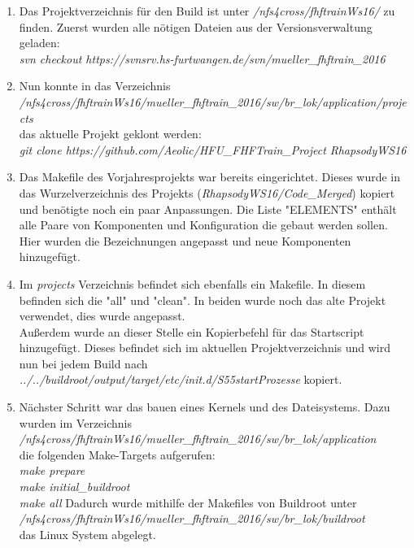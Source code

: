 \begin{enumerate}
	\item Das Projektverzeichnis für den Build ist unter \textit{/nfs4cross/fhftrainWs16/} zu finden. Zuerst wurden alle nötigen Dateien aus der Versionsverwaltung geladen:\\
	\textit{svn checkout https://svnsrv.hs-furtwangen.de/svn/mueller\_fhftrain\_2016}
	
	\item Nun konnte in das Verzeichnis\\ \textit{/nfs4cross/fhftrainWs16/mueller\_fhftrain\_2016/sw/br\_lok/application/projects}\\
	das aktuelle Projekt geklont werden:\\
	\textit{git clone https://github.com/Aeolic/HFU\_FHFTrain\_Project RhapsodyWS16}
	
	\item Das Makefile des Vorjahresprojekts war bereits eingerichtet. Dieses wurde in das Wurzelverzeichnis des Projekts (\textit{RhapsodyWS16/Code\_Merged}) kopiert und benötigte noch ein paar Anpassungen. Die Liste "ELEMENTS" enthält alle Paare von Komponenten und  Konfiguration die gebaut werden sollen. Hier wurden die Bezeichnungen angepasst und neue Komponenten hinzugefügt.
	
	\item Im \textit{projects} Verzeichnis befindet sich ebenfalls ein Makefile. In diesem befinden sich die "all" und "clean". In beiden wurde noch das alte Projekt verwendet, dies wurde angepasst.\\
	Außerdem wurde an dieser Stelle ein Kopierbefehl für das Startscript hinzugefügt. Dieses befindet sich im aktuellen Projektverzeichnis und wird nun bei jedem Build nach
	\textit{../../buildroot/output/target/etc/init.d/S55startProzesse} kopiert.
	
	\item Nächster Schritt war das bauen eines Kernels und des Dateisystems. Dazu wurden im Verzeichnis\\
	\textit{/nfs4cross/fhftrainWs16/mueller\_fhftrain\_2016/sw/br\_lok/application}\\
	die folgenden Make-Targets aufgerufen:\\
	\textit{make prepare}\\
	\textit{make initial\_buildroot}\\
	\textit{make all}
	Dadurch wurde mithilfe der Makefiles von Buildroot unter\\
	\textit{/nfs4cross/fhftrainWs16/mueller\_fhftrain\_2016/sw/br\_lok/buildroot}\\
	das Linux System abgelegt.
\end{enumerate}
